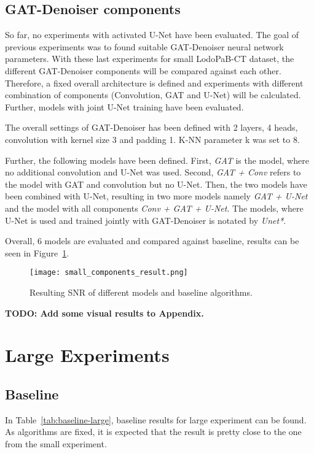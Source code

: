 \subsection{GAT-Denoiser components}
So far, no experiments with activated U-Net have been evaluated. 
The goal of previous experiments was to found suitable GAT-Denoiser neural network parameters.
With these last experiments for small LodoPaB-CT dataset, the different 
GAT-Denoiser components will be compared against each other.
Therefore, a fixed overall architecture is defined and experiments
with different combination of components (Convolution, GAT and U-Net) will be calculated.
Further, models with joint U-Net training have been evaluated.

The overall settings of GAT-Denoiser has been defined with 2 layers, 4 heads, convolution with 
kernel size 3 and padding 1. K-NN parameter k was set to 8.

Further, the following models have been defined.
First, \textit{GAT} is the model, where no additional convolution and 
U-Net was used. Second, \textit{GAT + Conv} refers to the model 
with GAT and convolution but no U-Net.
Then, the two models have been combined with U-Net, resulting in two more models
namely \textit{GAT + U-Net} and the model with all components \textit{Conv + GAT + U-Net}.
The models, where U-Net is used and trained jointly with GAT-Denoiser is 
notated by \textit{Unet*}. 

Overall, 6 models are evaluated and compared against baseline, results can be seen in Figure~\ref{fig:small_components}.

\begin{figure}[H]
  \centering
  \label{fig:small_components}
  \texttt{[image: small\_components\_result.png]}
  \caption{
    Resulting SNR of different models and baseline algorithms.
    }
\end{figure}


\textbf{TODO: Add some visual results to Appendix.}


\section{Large Experiments}

\subsection{Baseline}
In Table~\ref{tab:baseline-large}, baseline results for large experiment can be found.
As algorithms are fixed, it is expected that the result is pretty close to the one from the small experiment.

